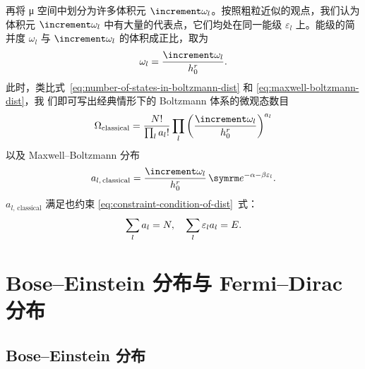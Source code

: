 再将 μ 空间中划分为许多体积元 $\incr{\omega_l}$。按照粗粒近似的观点，我们认为体积元
$\incr{\omega_l}$ 中有大量的代表点，它们均处在同一能级 $\varepsilon_l$ 上。能级的简并度 $\omega_l$
与 $\incr{\omega_l}$ 的体积成正比，取为
\begin{equation}
  \omega_l = \frac{\incr{\omega_l}}{h_0^r}.
\end{equation}
此时，类比式~\eqref{eq:number-of-states-in-boltzmann-dist} 和 \eqref{eq:maxwell-boltzmann-dist}，我
们即可写出经典情形下的 Boltzmann 体系的微观态数目
\begin{equation}
  \Omega_\text{classical}
  = \frac{N!}{\prod_l a_l!} \prod_l \qty(\frac{\incr{\omega_l}}{h_0^r})^{a_l}
\end{equation}
以及 Maxwell--Boltzmann 分布
\begin{equation}
  a_{l,\,\text{classical}} = \frac{\incr{\omega_l}}{h_0^r} \, \ee^{-\alpha-\beta\varepsilon_l}.
\end{equation}
$a_{l,\,\text{classical}}$ 满足也约束 \eqref{eq:constraint-condition-of-dist}~式：
\begin{equation}
  \sum_l a_l = N \qc \sum_l \varepsilon_l a_l = E.
\end{equation}

\section{Bose--Einstein 分布与 Fermi--Dirac 分布}

\subsection{Bose--Einstein 分布}

